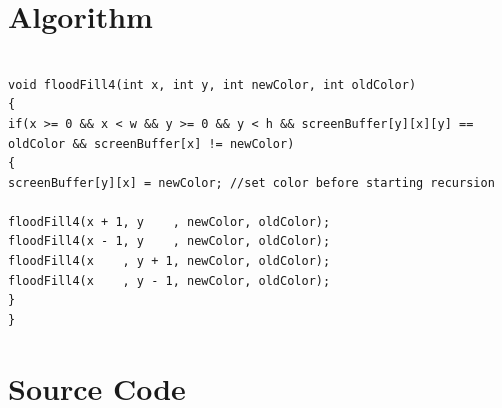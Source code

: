 \documentclass[11pt]{report}
\begin{document}
\section{Algorithm}
\begin{lstlisting}

void floodFill4(int x, int y, int newColor, int oldColor)
{
if(x >= 0 && x < w && y >= 0 && y < h && screenBuffer[y][x][y] == oldColor && screenBuffer[x] != newColor)
{
screenBuffer[y][x] = newColor; //set color before starting recursion

floodFill4(x + 1, y    , newColor, oldColor);
floodFill4(x - 1, y    , newColor, oldColor);
floodFill4(x    , y + 1, newColor, oldColor);
floodFill4(x    , y - 1, newColor, oldColor);
}
}
\end{lstlisting}

\section{Source Code}
\end{document}
